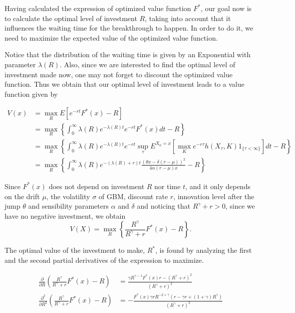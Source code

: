 Having calculated the expression of optimized value function $F^*$, our goal now is to calculate the optimal level of investment $R$, taking into account that it influences the waiting time for the breakthrough to happen. In order to do it, we need to maximize the expected value of the optimized value function.

Notice that the distribution of the waiting time is given by an Exponential with parameter $\lambda(R)$. Also, since we are interested to find the optimal level of investment made now, one may not forget to discount the optimized value function.
Thus we obtain that our optimal level of investment leads to a value function given by 


\begin{align*}
V(x) &=\max_R E \left[ e^{-rt} F^*(x) -R \right]\\
& =  \max_R  \left\{ \int_0 ^\infty \lambda(R) e^{-\lambda(R)t} e^{-rt} F^*(x) dt -R \right\} \\
&= \max_R \left\{ \int_0 ^\infty \lambda(R) e^{-\lambda(R)t} e^{-rt} 
\sup_\tau E ^{X_0=x}\left[\max_K e^{-r\tau}h(X_\tau,K) 1_{\{\tau<\infty\}} \right]
dt -R \right\} \\
&= \max_R \left\{  \int_0 ^\infty \lambda(R) e^{-(\lambda(R)+r)t} \frac{(\theta x -\delta (r-\mu))^2}{4 \alpha (r-\mu) x} -R \right\}
\end{align*}




Since $F^*(x)$ does not depend on investment $R$ nor time $t$, and it only depends on the drift $\mu$, the volatility $\sigma$ of GBM, discount rate $r$, innovation level after the jump $\theta$ and sensibility parameters $\alpha$ and $\delta$ and noticing that $R^\gamma+r>0$, since we have no negative investment, we obtain
$$ V(X) =\max_R \left\{ \frac{R^\gamma}{R^\gamma+r} F^*(x) -R \right\}.$$

The optimal value of the investment to make, $R^*$, is found by analyzing the first and the second partial derivatives of the expression to maximize.

\begin{align*}
\frac{\partial}{\partial R} \left( \frac{R^\gamma}{R^\gamma+r} F^*(x) -R \right) &= \frac{\gamma R^{\gamma-1}F^*(x)r-(R^\gamma+r)^2}{(R^\gamma+r)^2}\\
\frac{\partial^2}{\partial R^2} \left( \frac{R^\gamma}{R^\gamma+r} F^*(x) -R \right) &=
-\frac{F^*(x) \gamma r R^{-2+\gamma}(r-\gamma r+(1+\gamma)R^\gamma)}{(R^\gamma+r)^3}
\end{align*}



